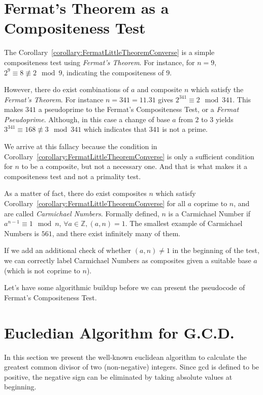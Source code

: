 \documentclass[11pt]{report}
\begin{document}
\section{Fermat's Theorem as a Compositeness Test}

The Corollary~\ref{corollary:FermatLittleTheoremConverse} is a simple compositeness test using \emph{Fermat's Theorem}. For instance, for $n = 9$, $2^9 \equiv 8 \not\equiv 2 \mod 9$, indicating the compositeness of $9$.

However, there do exist combinations of $a$ and composite $n$ which satisfy the \emph{Fermat's Theorem}. For instance $n = 341 = 11.31$ gives $2^{341} \equiv 2 \mod 341$. This makes $341$ a pseudoprime to the Fermat's Compositeness Test, or a \emph{Fermat Pseudoprime}. Although, in this case a change of base $a$ from $2$ to $3$ yields $3^{341} \equiv 168 \not\equiv 3 \mod 341$ which indicates that $341$ is not a prime.

We arrive at this fallacy because the condition in Corollary~\ref{corollary:FermatLittleTheoremConverse} is only a sufficient condition for $n$ to be a composite, but not a necessary one. And that is what makes it a compositeness test and not a primality test.

As a matter of fact, there do exist composites $n$ which satisfy Corollary~\ref{corollary:FermatLittleTheoremConverse} for all $a$ coprime to $n$, and are called \emph{Carmichael Numbers}. Formally defined, $n$ is a Carmichael Number if $a^{n-1} \equiv 1 \mod n$, $\forall a \in \mathbb{Z}, (a,n) = 1$. The smallest example of Carmichael Numbers is $561$, and there exist infinitely many of them. 

If we add an additional check of whether $(a,n) \neq 1$ in the beginning of the test, we can correctly label Carmichael Numbers as composites given a suitable base $a$ (which is not coprime to $n$).

Let's have some algorithmic buildup before we can present the pseudocode of Fermat's Compositeness Test.

\section{Eucledian Algorithm for G.C.D.}

In this section we present the well-known euclidean algorithm to calculate the greatest common divisor of two (non-negative) integers. Since gcd is defined to be positive, the negative sign can be eliminated by taking absolute values at beginning.
\end{document}
